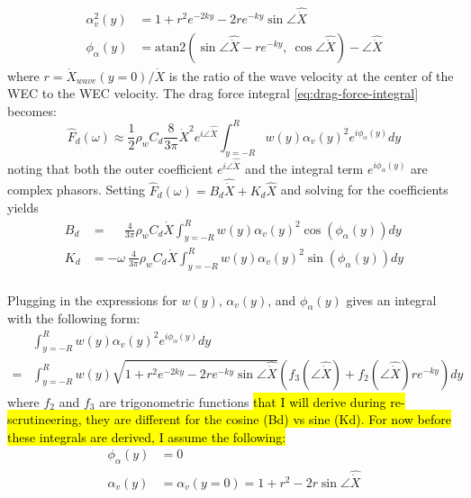 \begin{equation}
\begin{aligned}
    \alpha_v^2(y) &= 1 + r^2 e^{-2ky} - 2 r e^{-ky}  \sin\angle \hat{\dot{X}} \\
    \phi_\alpha(y) &= \mathrm{atan2}\left( \sin\angle \hat{\dot{X}} - r e^{-ky}, ~\cos\angle \hat{\dot{X}}\right) -  \angle\hat{\dot{X}}
\end{aligned}
\end{equation}
where $r = \dot{X}_{wave}(y=0)/ \dot{X}$ is the ratio of the wave velocity at the center of the WEC to the WEC velocity.
The drag force integral \eqref{eq:drag-force-integral} becomes:
\begin{equation}
    \hat{F}_d(\omega) \approx  \frac{1}{2} \rho_w C_d \frac{8}{3\pi}\dot{X}^2 e^{i\angle\hat{\dot{X}}}\int_{y=-R}^{R} w(y) \alpha_v(y)^2  e^{i\phi_\alpha(y)}dy
\end{equation}
noting that both the outer coefficient $e^{i\angle\hat{\dot{X}}}$ and the integral term $e^{i\phi_\alpha(y)}$ are complex phasors.
Setting $\hat{F}_{d}(\omega)%
=B_{d} \hat{\dot{X}} + K_{d} \hat{X}$ and solving for the coefficients yields
\begin{equation}\label{eq:drag-coeffs}
\begin{aligned}
B_{d} &= ~~~~~~\frac{4}{3\pi} \rho_w  C_{d} \dot{X} \int_{y=-R}^{R} w(y) \alpha_v(y)^2  \cos(\phi_\alpha(y))dy \\ %
K_{d} &= - \omega~\frac{4}{3\pi} \rho_w  C_{d} \dot{X} \int_{y=-R}^{R} w(y) \alpha_v(y)^2  \sin(\phi_\alpha(y))dy \\ %
\end{aligned}
\end{equation}

Plugging in the expressions for $w(y)$, $\alpha_v(y)$, and $\phi_\alpha(y)$ gives an integral with the following form:
\begin{equation}
\begin{aligned}
    &\int_{y=-R}^{R} w(y) \alpha_v(y)^2  e^{i\phi_\alpha(y)}dy \\
    = &\int_{y=-R}^{R} w(y) \sqrt{1 + r^2 e^{-2ky} - 2 r e^{-ky}  \sin\angle \hat{\dot{X}}} \left(f_3(\angle\hat{\dot{X}}) + f_2(\angle\hat{\dot{X}})re^{-ky}\right)  dy
\end{aligned}
\end{equation}
where $f_2$ and $f_3$ are trigonometric functions \hl{that I will derive during re-scrutineering, they are different for the cosine (Bd) vs sine (Kd).
For now before these integrals are derived, I assume the following:}
\begin{equation}
\begin{aligned}
    \phi_\alpha(y) &= 0 \\
    \alpha_v(y) &= \alpha_v(y=0) = 1 + r^2 - 2 r \sin\angle \hat{\dot{X}}
\end{aligned}
\end{equation}

